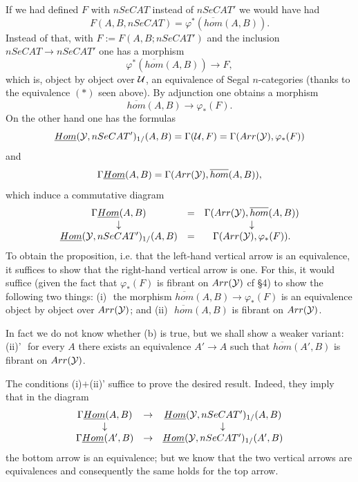 If we had defined $F$ with $nSeCAT$ instead of $nSeCAT'$
we would have had
$$
F(A,B, nSeCAT) = \varphi ^{\ast} (\overline{hom}(A,B)).
$$
Instead of that, with
$F:= F(A,B; nSeCAT')$
and the inclusion
$nSeCAT\rightarrow nSeCAT'$ one has a morphism
$$
\varphi ^{\ast} (\overline{hom}(A,B))\rightarrow F,
$$
which is, object by object over ${\cal U}$, an equivalence of
Segal $n$-categories (thanks to the equivalence $(\ast )$
seen above). By adjunction one obtains a morphism
$$
\overline{hom}(A,B)\rightarrow \varphi _{\ast}(F).
$$
On the other hand one has the formulas
$$
\underline{Hom}({\cal Y} , nSeCAT')_{1/}(A,B)=\Gamma ({\cal U} ,F) = \Gamma (Arr({\cal Y} ),
\varphi _{\ast} (F))
$$
and
$$
\Gamma \underline{Hom}(A,B)= \Gamma (   Arr({\cal Y} ), \overline{hom}(A,B)),
$$
which induce a commutative diagram
$$
\begin{array}{ccc}
\Gamma \underline{Hom}(A,B)&= &\Gamma ( Arr({\cal Y} ), \overline{hom}(A,B))\\
\downarrow && \downarrow \\
\underline{Hom}({\cal Y} , nSeCAT')_{1/}(A,B)&=& \Gamma (Arr({\cal Y} ),
\varphi _{\ast} (F)).
\end{array}
$$
To obtain the proposition,
i.e. that the left-hand vertical arrow is an equivalence, it suffices to
show that the right-hand vertical arrow is one. For this, it would
suffice  (given the fact that $\varphi _{\ast} (F)$ is fibrant
on $Arr({\cal Y} )$
cf \S 4)
to show the following two things:
\newline
(i)\,\, the morphism $\overline{hom}(A,B)\rightarrow \varphi _{\ast}(F)$ is
an equivalence object by object over $Arr({\cal Y} )$; and
\newline
(ii)\,\, $\overline{hom}(A,B)$ is fibrant on $Arr({\cal Y} )$.

In fact we do not know whether (b) is true, but we shall show a
weaker variant:
\newline
(ii)'\,\, for every $A$ there exists an equivalence $A'\rightarrow A$ such that
$\overline{hom}(A',B)$ is fibrant on $Arr({\cal Y} )$.

The conditions (i)$+$(ii)' suffice to prove the desired
result. Indeed, they imply
that in
the diagram $$
\begin{array}{ccc}
\Gamma \underline{Hom}(A,B)&\rightarrow &\underline{Hom}({\cal Y} ,
nSeCAT')_{1/}(A,B)\\
\downarrow & & \downarrow \\
\Gamma \underline{Hom}(A',B)&\rightarrow &\underline{Hom}({\cal Y} ,
nSeCAT')_{1/}(A',B)
\end{array}
$$
the bottom arrow is an equivalence; but we know that the two
vertical arrows are equivalences and consequently
the same holds for the top
arrow.


